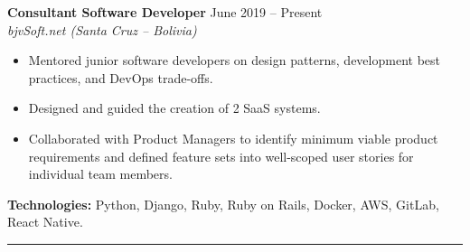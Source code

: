 \textbf{Consultant Software Developer} \hfill June 2019 -- Present\\
\textit{bjvSoft.net (Santa Cruz – Bolivia)}\\
\begin{itemize}
    \setlength{\itemsep}{0pt} %
    \setlength{\topsep}{0pt}  %
    \setlength{\parsep}{0pt}  %
    \setlength{\partopsep}{0pt} %
    \item Mentored junior software developers on design patterns, development best practices, and DevOps trade-offs.
    \item Designed and guided the creation of 2 SaaS systems.
    \item Collaborated with Product Managers to identify minimum viable product requirements and defined feature sets into well-scoped user stories for individual team members.
\end{itemize}
\textbf{Technologies:} Python, Django, Ruby, Ruby on Rails, Docker, AWS, GitLab, React Native.
\hrule
\vspace{1em}
